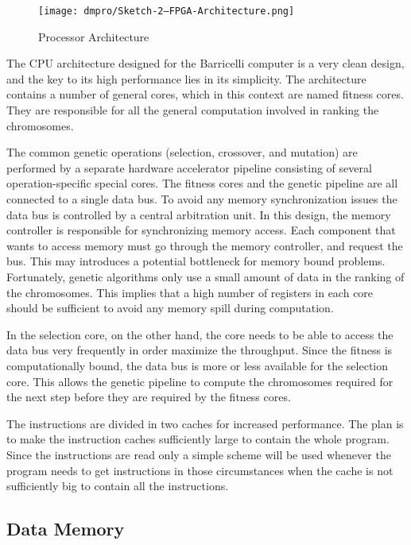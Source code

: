 \begin{figure}[H]
\texttt{[image: dmpro/Sketch-2---FPGA-Architecture.png]}
\caption{Processor Architecture}
\label{figure:fpga-architecture}
\end{figure}

The CPU architecture designed for the Barricelli computer is a very clean design, and the key to its high performance lies in its simplicity.
The architecture contains a number of general cores, which in this context are named fitness cores.
They are responsible for all the general computation involved in ranking the chromosomes.

The common genetic operations (selection, crossover, and mutation) are performed by a separate hardware accelerator pipeline consisting of several operation-specific special cores.
The fitness cores and the genetic pipeline are all connected to a single data bus.
To avoid any memory synchronization issues the data bus is controlled by a central arbitration unit.
In this design, the memory controller is responsible for synchronizing memory access.
Each component that wants to access memory must go through the memory controller, and request the bus.
This may introduces a potential bottleneck for memory bound problems.
Fortunately, genetic algorithms only use a small amount of data in the ranking of the chromosomes.
This implies that a high number of registers in each core should be sufficient to avoid any memory spill during computation.

In the selection core, on the other hand, the core needs to be able to access the data bus very frequently in order maximize the throughput.
Since the fitness is computationally bound, the data bus is more or less available for the selection core.
This allows the genetic pipeline to compute the chromosomes required for the next step before they are required by the fitness cores. 


The instructions are divided in two caches for increased performance.
The plan is to make the instruction caches sufficiently large to contain the whole program.
Since the instructions are read only a simple scheme will be used whenever the program needs to get instructions in those circumstances when the cache is not sufficiently big to contain all the instructions. 


\subsection{Data Memory}


